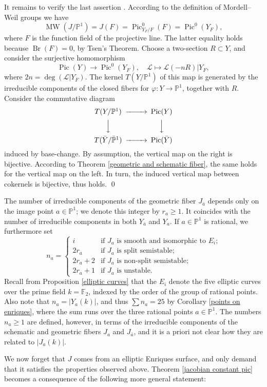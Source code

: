 \documentclass[oneside, 12pt]{amsart}
\theoremstyle{definition}
\theoremstyle{remark}
\newcommand{\FF}{\mathbb{F}}
\newcommand{\PP}{\mathbb{P}}
\newcommand{\shL}{\mathscr{L}}
\newcommand{\Br}{\operatorname{Br}}
\newcommand{\lra}{\longrightarrow}
\newcommand{\MW}{\operatorname{MW}}
\newcommand{\Pic}{\operatorname{Pic}}
\newcommand{\ra}{\rightarrow}
\newcommand{\bY}{{\bar{Y}}}
\newcommand{\ba}{{\bar{a}}}
\begin{document}
It remains to verify the last assertion . According to the definition of Mordell--Weil groups we have
$$
\MW(J/\PP^1)=J(F)=\Pic^0_{Y_F/F}(F)=\Pic^0(Y_F),
$$
where $F$ is the function field of the projective line. The latter equality holds because $\Br(F)=0$, by Tsen's Theorem.
Choose a two-section $R\subset Y$, and consider the  surjective homomorphism
$$
\Pic(Y)\lra \Pic^0(Y_F),\quad \shL\longmapsto \shL(-nR) | Y_F,
$$
where $2n=\deg(\shL|Y_F)$. The kernel $T(Y/\PP^1)$ of this map is generated by the irreducible components 
of the closed fibers for $\varphi:Y\ra\PP^1$, together with $R$.  Consider the commutative diagram
$$
\begin{CD}
T(Y/\PP^1)	@>>> 	\Pic(Y)\\
@VVV		@VVV\\
T(\bY/\bar{\PP}^1)	@>>>	\Pic(\bY)
\end{CD}
$$
induced by base-change. By assumption,  the vertical map on the right is bijective.
According to Theorem \ref{geometric and schematic fiber}, the same holds for the vertical map on the left.
In turn, the induced vertical map  between cokernels is bijective, thus  holds.
\qed

\medskip
The number of irreducible components   of the geometric fiber $J_\ba$ depends only on the image point $a\in \PP^1$;
we denote this integer by $r_a\geq 1$. It coincides with the number of irreducible components in both $Y_\ba$ and $Y_a$.
If $a\in\PP^1$ is rational, we furthermore set
$$
n_a=
\begin{cases}
i		& \text{if $J_a$ is smooth and isomorphic to $E_i$;}\\
2r_a 	& \text{if $J_a$ is split semistable;}\\
2r_a+2	& \text{if $J_a$ is non-split semistable;}\\
2r_a+1	& \text{if $J_a$ is unstable.}
\end{cases}
$$ 
Recall from Proposition \ref{elliptic curves} that the $E_i$ denote the five elliptic curves over the prime field
$k=\FF_2$,  indexed by the order of the group of  rational points.
Also note  that $n_a=| Y_a(k)|$, and thus
$\sum n_a=25$ by  Corollary \ref{points on enriques}, where the sum runs over the three rational points $a\in\PP^1$. 
The numbers $n_a\geq 1$ are defined,  however,  
in terms of the irreducible components of the schematic and geometric fibers $J_a$ and $J_\ba$, and it is a priori not clear 
how they  are related to $|J_a(k)|$.

We now forget that $J$ comes from an elliptic Enriques surface,
and only demand that it satisfies the properties  observed above.
Theorem \ref{jacobian constant pic} becomes a consequence of the following more general statement:
\end{document}
